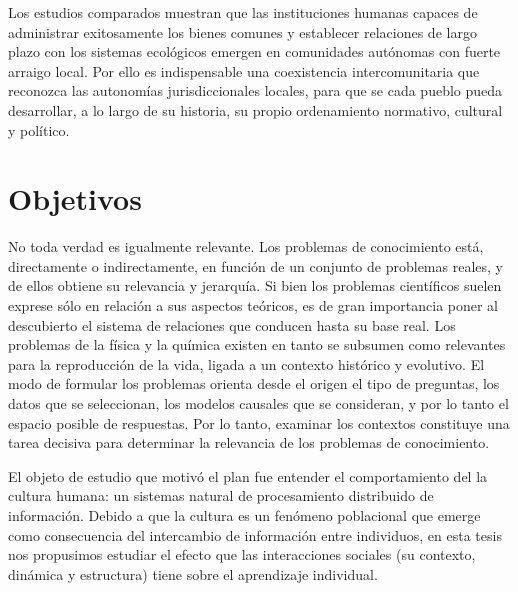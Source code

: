 \documentclass[a4paper,11pt]{book}
\theoremstyle{definition}
\begin{document}
Los estudios comparados muestran que las instituciones humanas capaces de administrar exitosamente los bienes comunes y establecer relaciones de largo plazo con los sistemas ecológicos emergen en comunidades autónomas con fuerte arraigo local.
%
Por ello es indispensable una coexistencia intercomunitaria que reconozca las autonomías jurisdiccionales locales, para que se cada pueblo pueda desarrollar, a lo largo de su historia, su propio ordenamiento normativo, cultural y político.

\section{Objetivos}



No toda verdad es igualmente relevante.
%
Los problemas de conocimiento está, directamente o indirectamente, en función de un conjunto de problemas reales, y de ellos obtiene su relevancia y jerarquía.
%
Si bien los problemas científicos suelen exprese sólo en relación a sus aspectos teóricos, es de gran importancia poner al descubierto el sistema de relaciones que conducen hasta su base real.
%
Los problemas de la física y la química existen en tanto se subsumen como relevantes para la reproducción de la vida, ligada a un contexto histórico y evolutivo.
%
El modo de formular los problemas orienta desde el origen el tipo de preguntas, los datos que se seleccionan, los modelos causales que se consideran, y por lo tanto el espacio posible de respuestas.
%
Por lo tanto, examinar los contextos constituye una tarea decisiva para determinar la relevancia de los problemas de conocimiento.


El objeto de estudio que motivó el plan fue entender el comportamiento del la cultura humana: un sistemas natural de procesamiento distribuido de información.
%
Debido a que la cultura es un fen\'omeno poblacional que emerge como consecuencia del intercambio de informaci\'on entre individuos, en esta tesis nos propusimos estudiar el efecto que las interacciones sociales (su contexto, dinámica y estructura) tiene sobre el aprendizaje individual.

\end{document}
